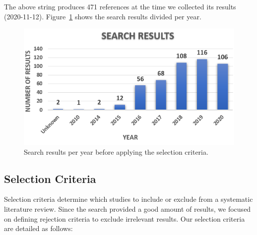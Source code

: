 The above string produces 471 references at the time we collected its results (2020-11-12). 
Figure~\ref{fig:total-papers-per-year} shows the search results divided per year.

\begin{figure}[h]
	\centering
	\includegraphics[width=0.5\linewidth]{images/yearvsarticles.png}
	\caption{Search results per year before applying the selection criteria.}
	\label{fig:total-papers-per-year}
\end{figure}	 


\subsection{Selection Criteria}

Selection criteria determine which studies to include or exclude from a systematic literature review. 
Since the search provided a good amount of results, we focused on defining rejection criteria to exclude irrelevant results.
Our selection criteria are detailed as follows:



